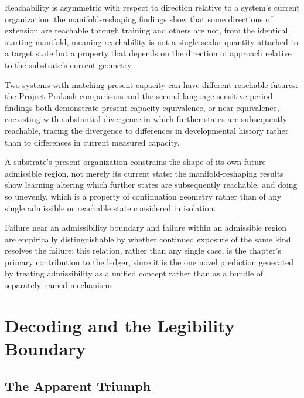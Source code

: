 \documentclass[11pt]{book}
\begin{document}
Reachability is asymmetric with respect to direction relative to a system's current organization: the manifold-reshaping findings show that some directions of extension are reachable through training and others are not, from the identical starting manifold, meaning reachability is not a single scalar quantity attached to a target state but a property that depends on the direction of approach relative to the substrate's current geometry.

Two systems with matching present capacity can have different reachable futures: the Project Prakash comparisons and the second-language sensitive-period findings both demonstrate present-capacity equivalence, or near equivalence, coexisting with substantial divergence in which further states are subsequently reachable, tracing the divergence to differences in developmental history rather than to differences in current measured capacity.

A substrate's present organization constrains the shape of its own future admissible region, not merely its current state: the manifold-reshaping results show learning altering which further states are subsequently reachable, and doing so unevenly, which is a property of continuation geometry rather than of any single admissible or reachable state considered in isolation.

Failure near an admissibility boundary and failure within an admissible region are empirically distinguishable by whether continued exposure of the same kind resolves the failure: this relation, rather than any single case, is the chapter's primary contribution to the ledger, since it is the one novel prediction generated by treating admissibility as a unified concept rather than as a bundle of separately named mechanisms.


\chapter{Decoding and the Legibility Boundary}

\section{The Apparent Triumph}
\end{document}
